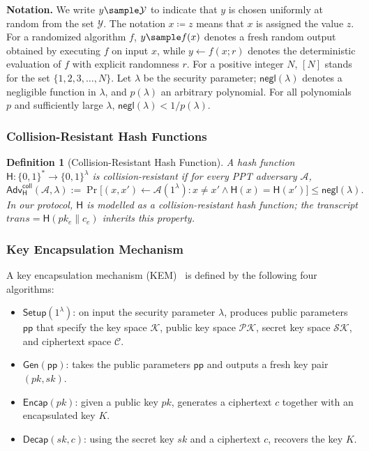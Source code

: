 \documentclass[runningheads]{llncs}
\newtheorem{defn}{Definition}[]
\newcommand{\setup}{\mathsf{Setup}}
\newcommand{\negli}{\mathsf{negl}}
\newcommand{\msh}{\mathsf{H}}
\begin{document}
\noindent\textbf{Notation.}
We write $y\sample \mathcal{Y}$ to indicate that $y$ is chosen uniformly at random from the set $\mathcal{Y}$.
The notation $x\coloneqq z$ means that $x$ is assigned the value $z$.
For a randomized algorithm $f$, $y\sample f(x)$ denotes a fresh random output obtained by executing $f$ on input $x$, while $y\gets f(x;r)$ denotes the deterministic evaluation of $f$ with explicit randomness $r$.
For a positive integer $N$, $[N]$ stands for the set $\{1,2,3,\dots,N\}$.
Let $\lambda$ be the security parameter; $\negli(\lambda)$ denotes a negligible function in $\lambda$, and $p(\lambda)$ an arbitrary polynomial.
For all polynomials $p$ and sufficiently large $\lambda$, $\negli(\lambda) < 1/p(\lambda)$.

\subsubsection{Collision-Resistant Hash Functions}

\begin{defn}[Collision-Resistant Hash Function] \label{def:crhf}
A hash function $\msh : \{0,1\}^* \to \{0,1\}^\lambda$ is collision-resistant if for every PPT adversary $\mathcal{A}$,
\[
\mathsf{Adv}_{\msh}^{\mathsf{coll}}(\mathcal{A}, \lambda) := \Pr\bigl[(x, x') \gets \mathcal{A}(1^\lambda) : x \neq x' \wedge \msh(x) = \msh(x')\bigr] \leq \negli(\lambda).
\]
In our protocol, $\msh$ is modelled as a collision-resistant hash function; the transcript $\mathit{trans} = \msh(pk_e \| c_e)$ inherits this property.
\end{defn}

\subsubsection{Key Encapsulation Mechanism}
\label{kem def}
A key encapsulation mechanism (KEM)~\cite{EPRINT:Shoup01} is defined by the following four algorithms:
\begin{itemize}[itemsep=0pt, topsep=0pt, parsep=0pt]
   \item $\setup(1^{\lambda})$: on input the security parameter $\lambda$, produces public parameters $\mathsf{pp}$ that specify the key space $\mathcal{K}$, public key space $\mathcal{PK}$, secret key space $\mathcal{SK}$, and ciphertext space $\mathcal{C}$.
   \item $\mathsf{Gen}(\mathsf{pp})$: takes the public parameters $\mathsf{pp}$ and outputs a fresh key pair $(pk,sk)$.
   \item $\mathsf{Encap}(pk)$: given a public key $pk$, generates a ciphertext $c$ together with an encapsulated key $K$.
   \item $\mathsf{Decap}(sk,c)$: using the secret key $sk$ and a ciphertext $c$, recovers the key $K$.
\end{itemize}
\end{document}
